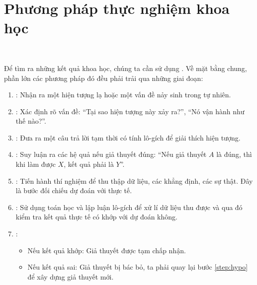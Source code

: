 \section{Phương pháp thực nghiệm khoa học}

\

Để tìm ra những kết quả khoa học, chúng ta cần sử dụng . Về mặt bằng chung, phần lớn các phương pháp đó đều phải trải qua những giai đoạn:

\begin{enumerate}[label=\protect\textbf{\color{colorEmphasis}\arabic*.}]
    \item {}: Nhận ra một hiện tượng lạ hoặc một vấn đề nảy sinh trong tự nhiên.
    \item {}: Xác định rõ vấn đề: ``Tại sao hiện tượng này xảy ra?'', ``Nó vận hành như thế nào?''.
    \item {}: Đưa ra một câu trả lời tạm thời có tính lô-gích để giải thích hiện tượng. \label{step:hypo}
    \item {}: Suy luận ra các hệ quả nếu giả thuyết đúng: ``Nếu giả thuyết $A$ là đúng, thì khi làm được $X$, kết quả phải là $Y$''.
    \item {}: Tiến hành thí nghiệm để thu thập dữ liệu, các khẳng định, các sự thật. Đây là bước đối chiếu dự đoán với thực tế.
    \item {}: Sử dụng toán học và lập luận lô-gích để xử lí dữ liệu thu được và qua đó kiểm tra kết quả thực tế có khớp với dự đoán không.
    \item {}:
          \begin{itemize}
              \item Nếu kết quả khớp: Giả thuyết được tạm chấp nhận.
              \item Nếu kết quả sai: Giả thuyết bị bác bỏ, ta phải quay lại bước \ref{step:hypo} để xây dựng giả thuyết mới.
          \end{itemize}
\end{enumerate}

